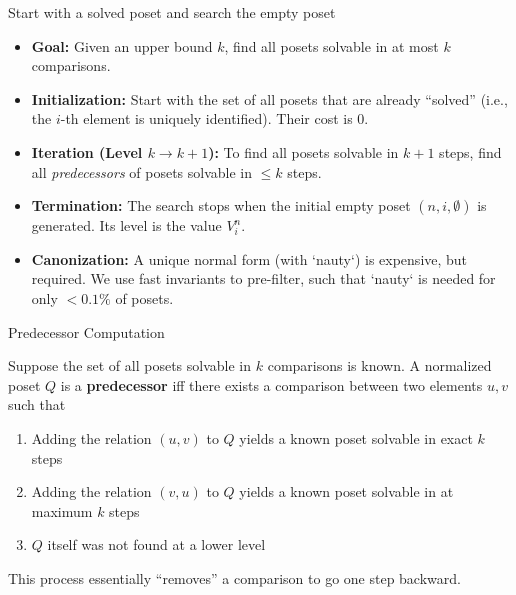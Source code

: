 \begin{frame}{\insertsection}
  Start with a solved poset and search the empty poset
  \vfill
  \begin{itemize}
    \item<+-> \textbf{Goal:} Given an upper bound $k$, find all posets solvable in at most $k$ comparisons.
    \item<+-> \textbf{Initialization:} Start with the set of all posets that are already ``solved'' (i.e., the $i$-th element is uniquely identified). Their cost is 0.
    \item<+-> \textbf{Iteration (Level $k \to k+1$):} To find all posets solvable in $k+1$ steps, find all \textit{predecessors} of posets solvable in $\leq k$ steps.
    \item<+-> \textbf{Termination:} The search stops when the initial empty poset $(n, i, \emptyset)$ is generated. Its level is the value $V_i^n$.
    \item<+-> \textbf{Canonization:} A unique normal form (with `nauty`) is expensive, but required. We use fast invariants to pre-filter, such that `nauty` is needed for only $< 0.1\%$ of posets.
  \end{itemize}
\end{frame}

\begin{frame}{Predecessor Computation}
  \begin{definition}[Predecessor]
    Suppose the set of all posets solvable in $k$ comparisons is known.
    A normalized poset $Q$ is a \textbf{predecessor} iff there exists a comparison between two elements $u,v$ such that
    \begin{enumerate}
      \item<+-> Adding the relation $(u,v)$ to $Q$ yields a known poset solvable in exact $k$ steps
      \item<+-> Adding the relation $(v,u)$ to $Q$ yields a known poset solvable in at maximum $k$ steps
      \item<+-> $Q$ itself was not found at a lower level
    \end{enumerate}
  \end{definition}
  \vfill
  This process essentially ``removes'' a comparison to go one step backward.
\end{frame}

